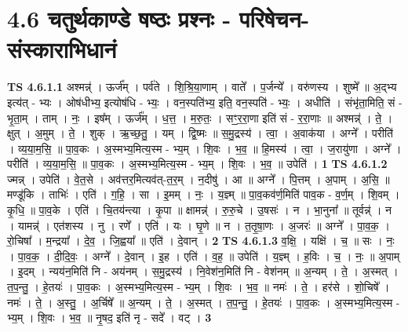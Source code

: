 \documentclass[17pt]{extarticle}
\begin{document}
\section*{ 4.6      चतुर्थकाण्डे षष्ठः प्रश्नः - परिषेचन-संस्काराभिधानं }
                                \textbf{ TS 4.6.1.1} \newline
                  अश्मन्न्॑ । ऊर्ज᳚म् । पर्व॑ते । शि॒श्रि॒या॒णाम् । वाते᳚ । प॒र्जन्ये᳚ । वरु॑णस्य । शुष्मे᳚ ॥ अ॒द्भ्य इत्य॑त् - भ्यः । ओष॑धीभ्य॒ इत्योष॑धि - भ्यः॒ । वन॒स्पति॑भ्य॒ इति॒ वन॒स्पति॑ - भ्यः॒ । अधीति॑ । संभृ॑ता॒मिति॒ सं - भृ॒ता॒म् । ताम् । नः॒ । इष᳚म् । ऊर्ज᳚म् । ध॒त्त॒ । म॒रु॒तः॒ । सꣳ॒॒र॒रा॒णा इति॑ सं - र॒रा॒णाः ॥ अश्मन्न्॑ । ते॒ । क्षुत् । अ॒मुम् । ते॒ । शुक् । ऋ॒च्छ॒तु॒ । यम् । द्वि॒ष्मः ॥ स॒मु॒द्रस्य॑ । त्वा॒ । अ॒वाक॑या । अग्ने᳚ । परीति॑ । व्य॒या॒म॒सि॒ ॥ पा॒व॒कः । अ॒स्मभ्य॒मित्य॒स्म - भ्य॒म् । शि॒वः । भ॒व॒ ॥ हि॒मस्य॑ । त्वा॒ । ज॒रायु॑णा । अग्ने᳚ । परीति॑ । व्य॒या॒म॒सि॒ ॥ पा॒व॒कः । अ॒स्मभ्य॒मित्य॒स्म - भ्य॒म् । शि॒वः । भ॒व॒ ॥ उपेति॑ । \textbf{  1} \newline
                  \newline
                                \textbf{ TS 4.6.1.2} \newline
                  ज्मन्न् । उपेति॑ । वे॒त॒से । अव॑त्तर॒मित्यव॑त्-त॒र॒म् । न॒दीषु॑ । आ ॥ अग्ने᳚ । पि॒त्तम् । अ॒पाम् । अ॒सि॒ ॥ मण्डू॑कि । ताभिः॑ । एति॑ । ग॒हि॒ । सा । इ॒मम् । नः॒ । य॒ज्ञ्म् ॥ पा॒व॒कव॑र्ण॒मिति॑ पाव॒क - व॒र्ण॒म् । शि॒वम् । कृ॒धि॒ ॥ पा॒व॒के । एति॑ । चि॒तय॑न्त्या । कृ॒पा ॥ क्षामन्न्॑ । रु॒रु॒चे । उ॒षसः॑ । न । भा॒नुना᳚ ॥ तूर्वन्न्॑ । न । यामन्न्॑ । एत॑शस्य । नु । रणे᳚ । एति॑ । यः । घृ॒णे ॥ न । त॒तृ॒षा॒णः । अ॒जरः॑ ॥ अग्ने᳚ । पा॒व॒क॒ । रो॒चिषा᳚ । म॒न्द्रया᳚ । दे॒व॒ । जि॒ह्वया᳚ ॥ एति॑ । दे॒वान् । \textbf{  2 } \newline
                  \newline
                                \textbf{ TS 4.6.1.3} \newline
                  व॒क्षि॒ । यक्षि॑ । च॒ ॥ सः । नः॒ । पा॒व॒क॒ । दी॒दि॒वः॒ । अग्ने᳚ । दे॒वान् । इ॒ह । एति॑ । व॒ह॒ ॥ उपेति॑ । य॒ज्ञ्म् । ह॒विः । च॒ । नः॒ ॥ अ॒पाम् । इ॒दम् । न्यय॑न॒मिति॑ नि - अय॑नम् । स॒मु॒द्रस्य॑ । नि॒वेश॑न॒मिति॑ नि - वेश॑नम् ॥ अ॒न्यम् । ते॒ । अ॒स्मत् । त॒प॒न्तु॒ । हे॒तयः॑ । पा॒व॒कः । अ॒स्मभ्य॒मित्य॒स्म - भ्य॒म् । शि॒वः । भ॒व॒ ॥ नमः॑ । ते॒ । हर॑से । शो॒चिषे᳚ । नमः॑ । ते॒ । अ॒स्तु॒ । अ॒र्चिषे᳚ ॥ अ॒न्यम् । ते॒ । अ॒स्मत् । त॒प॒न्तु॒ । हे॒तयः॑ । पा॒व॒कः । अ॒स्मभ्य॒मित्य॒स्म - भ्य॒म् । शि॒वः । भ॒व॒ ॥ नृ॒षद॒ इति॑ नृ - सदे᳚ । वट् । \textbf{  3} \newline
                  \newline
\end{document}
